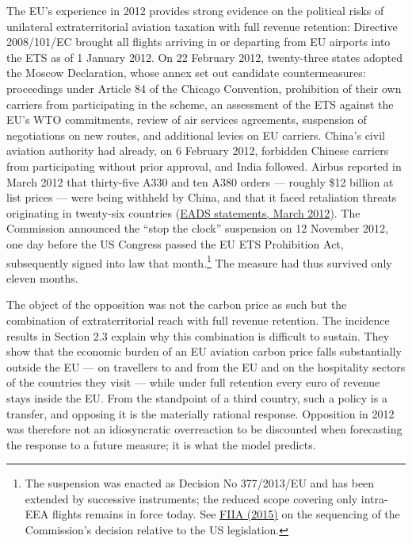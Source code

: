 The EU's experience in 2012 provides strong evidence on the political risks of unilateral extraterritorial aviation taxation with full revenue retention:  Directive 2008/101/EC brought all flights arriving in or departing from EU airports into the ETS as of 1 January 2012. On 22 February 2012, twenty-three states adopted the Moscow Declaration, whose annex set out candidate countermeasures: proceedings under Article 84 of the Chicago Convention, prohibition of their own carriers from participating in the scheme, an assessment of the ETS against the EU's WTO commitments, review of air services agreements, suspension of negotiations on new routes, and additional levies on EU carriers. China's civil aviation authority had already, on 6 February 2012, forbidden Chinese carriers from participating without prior approval, and India followed. Airbus reported in March 2012 that thirty-five A330 and ten A380 orders --- roughly \$12 billion at list prices --- were being withheld by China, and that it faced retaliation threats originating in twenty-six countries (\href{https://www.aljazeera.com/economy/2012/3/9/eu-china-dispute-delaying-airbus-orders}{EADS statements, March 2012}). The Commission announced the ``stop the clock'' suspension on 12 November 2012, one day before the US Congress passed the EU ETS Prohibition Act, subsequently signed into law that month.\footnote{The suspension was enacted as Decision No 377/2013/EU and has been extended by successive instruments; the reduced scope covering only intra-EEA flights remains in force today. See \href{https://fiia.fi/en/publication/the-conflict-over-aviation-emissions}{FIIA (2015)} on the sequencing of the Commission's decision relative to the US legislation.} The measure had thus survived only eleven months.

The object of the opposition was not the carbon price as such but the combination of extraterritorial reach with full revenue retention. The incidence results in Section 2.3 explain why this combination is difficult to sustain. They show that the economic burden of an EU aviation carbon price falls substantially outside the EU --- on travellers to and from the EU and on the hospitality sectors of the countries they visit --- while under full retention every euro of revenue stays inside the EU. From the standpoint of a third country, such a policy is a transfer, and opposing it is the materially rational response. Opposition in 2012 was therefore not an idiosyncratic overreaction to be discounted when forecasting the response to a future measure; it is what the model predicts.

